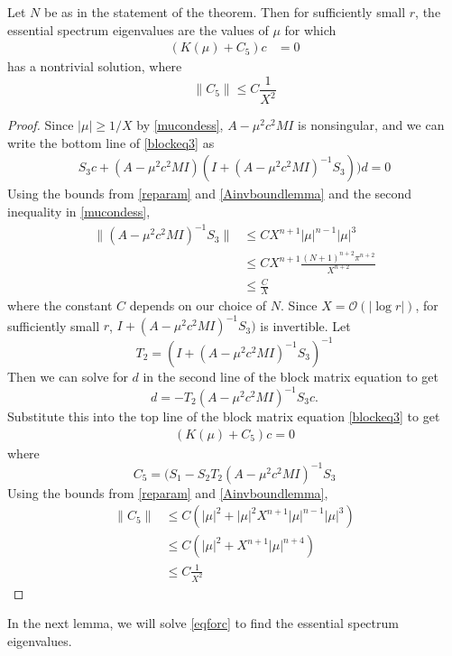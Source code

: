 \documentclass[thesis.tex]{subfiles}
\begin{document}
\begin{lemma}\label{ceqlemma}
Let $N$ be as in the statement of the theorem. Then for sufficiently small $r$, the essential spectrum eigenvalues are the values of $\mu$ for which 
\begin{align}\label{eqforc}
(K(\mu) + C_5)c &= 0
\end{align}
has a nontrivial solution, where
\[
\|C_5\| \leq C \frac{1}{X^2}
\]
\begin{proof}
Since $|\mu| \geq 1/X$ by \cref{mucondess}, $A - \mu^2 c^2 MI$ is nonsingular, and we can write the bottom line of \eqref{blockeq3} as 
\begin{align}\label{blockeqbottom}
S_3 c + (A - \mu^2 c^2 MI)(I + (A - \mu^2 c^2 MI)^{-1} S_3))d = 0
\end{align}
Using the bounds from \cref{reparam} and \cref{Ainvboundlemma} and the second inequality in \cref{mucondess},
\begin{align*}
\|(A - \mu^2 c^2 MI)^{-1} S_3 \|
&\leq C X^{n+1} |\mu|^{n-1} |\mu|^3 \\
&\leq C X^{n+1}\frac{(N+1)^{n+2} \pi^{n+2}}{X^{n+2}} \\
&\leq \frac{C}{X}
\end{align*}
where the constant $C$ depends on our choice of $N$. Since $X = \mathcal{O}(|\log r|)$, for sufficiently small $r$, $I + (A - \mu^2 c^2 MI)^{-1} S_3)$ is invertible. Let
\[
T_2 = (I + (A - \mu^2 c^2 MI)^{-1} S_3)^{-1}
\]
Then we can solve for $d$ in the second line of the block matrix equation to get
\[
d = -T_2 (A - \mu^2 c^2 MI)^{-1}S_3 c.
\]
Substitute this into the top line of the block matrix equation \cref{blockeq3} to get
\begin{align*}
(K(\mu) + C_5) c = 0
\end{align*}
where 
\[
C_5 = (S_1 - S_2 T_2 (A - \mu^2 c^2 MI)^{-1}S_3
\]
Using the bounds from \cref{reparam} and \cref{Ainvboundlemma},
\begin{align*}
\| C_5 \| &\leq C \left( |\mu|^2 + |\mu|^2 X^{n+1} |\mu|^{n-1}|\mu|^3 \right) \\
&\leq C \left( |\mu|^2 + X^{n+1}|\mu|^{n+4} \right) \\
&\leq C \frac{1}{X^2}
\end{align*}
\end{proof}
\end{lemma}

In the next lemma, we will solve \cref{eqforc} to find the essential spectrum eigenvalues.
\end{document}

